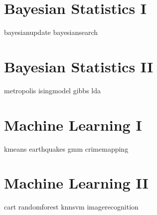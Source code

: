 \documentclass[nociteref]{newsiambook}
\begin{document}
\part{Bayesian Statistics I}
{bayesianupdate}
{bayesiansearch}

\part{Bayesian Statistics II}
{metropolis}
{isingmodel}
{gibbs}
{lda}

\part{Machine Learning I}
{kmeans}
{earthquakes}
{gmm}
{crimemapping}

\part{Machine Learning II}
{cart}
{randomforest}
{knnsvm}
{imagerecognition}
\end{document}
